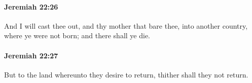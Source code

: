 		\paragraph{Jeremiah 22:26} %
			\label{JEREMIAH-22-26}

			And I will cast thee out, and thy mother that bare thee, into another country, where ye were not born; and there shall ye die.


		\paragraph{Jeremiah 22:27} %
			\label{JEREMIAH-22-27}

			But to the land whereunto they desire to return, thither shall they not return.


